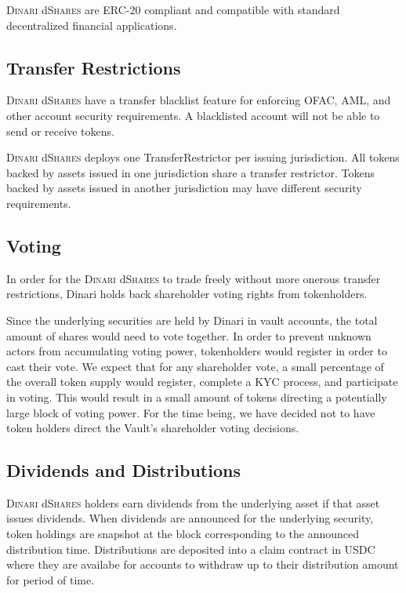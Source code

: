 \documentclass[sigconf,nonacm,prologue,table]{acmart}
\newcommand{\dshares}{\textsc{Dinari} d\textsc{Shares} }
\begin{document}
\dshares are ERC-20 compliant and compatible with standard decentralized financial applications.

\subsection{Transfer Restrictions}

\dshares have a transfer blacklist feature for enforcing OFAC, AML, and other account security requirements. A blacklisted account will not be able to send or receive tokens.

\dshares deploys one TransferRestrictor per issuing jurisdiction. All tokens backed by assets issued in one jurisdiction share a transfer restrictor. Tokens backed by assets issued in another jurisdiction may have different security requirements.

\subsection{Voting}

In order for the \dshares to trade freely without more onerous transfer restrictions, Dinari holds back shareholder voting rights from tokenholders.

Since the underlying securities are held by Dinari in vault accounts, the total amount of shares would need to vote together. In order to prevent unknown actors from accumulating voting power, tokenholders would register in order to cast their vote. We expect that for any shareholder vote, a small percentage of the overall token supply would register, complete a KYC process, and participate in voting. This would result in a small amount of tokens directing a potentially large block of voting power. For the time being, we have decided not to have token holders direct the Vault’s shareholder voting decisions.

\subsection{Dividends and Distributions}

\dshares holders earn dividends from the underlying asset if that asset issues dividends. When dividends are announced for the underlying security, token holdings are snapshot at the block corresponding to the announced distribution time. Distributions are deposited into a claim contract in USDC where they are availabe for accounts to withdraw up to their distribution amount for period of time.
\end{document}

